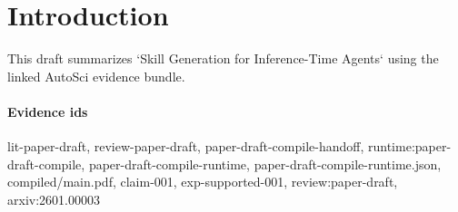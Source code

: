 \section{Introduction}
This draft summarizes `Skill Generation for Inference-Time Agents` using the linked AutoSci evidence bundle.

\paragraph{Evidence ids} lit-paper-draft, review-paper-draft, paper-draft-compile-handoff, runtime:paper-draft-compile, paper-draft-compile-runtime, paper-draft-compile-runtime.json, compiled/main.pdf, claim-001, exp-supported-001, review:paper-draft, arxiv:2601.00003

